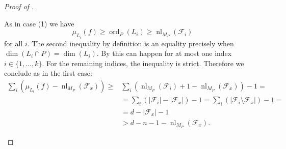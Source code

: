 \documentclass[10pt,a4paper]{amsart}
\newcommand{\cF}{{\mathcal F}}
\newcommand{\nl}{\operatorname{nl}}
\newcommand{\ord}{\operatorname{ord}}
\begin{document}
\begin{proof}[Proof of ]
\begin{enumerate}
    As in case (1) we have
    \begin{equation*}
        \mu_{L_i}(f) \geq \ord_P(L_i) \geq \nl_{M_P}(\cF_i) 
    \end{equation*}
    for all $i$. The second inequality by definition is an equality precisely when $\dim(L_i\cap P)=\dim(L_i)$. By  this can happen for at most one index $i\in \{1,\ldots,k\}$.  For the remaining indices, the inequality is strict. Therefore we conclude as in the first case:
    \begin{equation*}
    \begin{split}
        \sum_i \left( \mu_{L_i}(f) - \nl_{M_P}(\cF_x) \right) \geq &\sum_i \left( \nl_{M_P}(\cF_i) + 1 - \nl_{M_P}(\cF_x) \right) - 1 = \\
        &= \sum_i \left(|\cF_i| - |\cF_x|\right) - 1 = \sum_i \left( |\cF_i \setminus \cF_x| \right) - 1 = \\
        &= d - |\cF_x| - 1 \\&> d - n - 1 - \nl_{M_P}(\cF_x).
    \end{split} 
    \end{equation*}
\end{enumerate}
\end{proof}
\end{document}
